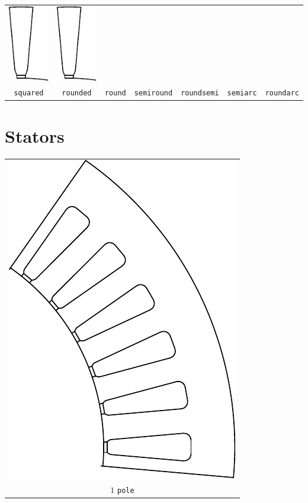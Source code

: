 \documentclass[a4paper,11pt,oneside]{report}
\begin{document}
{\begin{tabular}{ccccccc}
\includegraphics{../SPM/examples/slots/semiarc_slot} &
\includegraphics{../SPM/examples/slots/roundarc_slot} \\
%
\texttt{squared} &
\texttt{rounded} &
\texttt{round} &
\texttt{semiround} &
\texttt{roundsemi} &
\texttt{semiarc} & 
\texttt{roundarc}
\end{tabular}}
\vspace{1cm}


\newpage
\section{Stators}
\begin{tabular}{c}
\includegraphics[scale=0.75]{../SPM/examples/stators/1pole} 
\\
$ 1 $ \texttt{pole}
\end{tabular}
\vspace{5mm}
\end{document}
